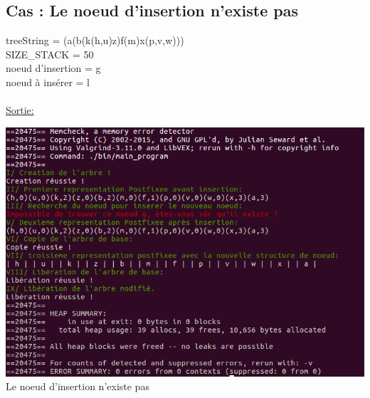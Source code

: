 \documentclass[a4paper]{article}
\begin{document}
\subsection{Cas : Le noeud d'insertion n'existe pas}
treeString = (a(b(k(h,u)z)f(m)x(p,v,w)))
\\ 
SIZE\_STACK = 50
\\
noeud d'insertion = g
\\
noeud à insérer = l
\\
\\
\underline{Sortie: }
\begin{center}
\includegraphics[scale=0.6]{pere_existe_pas.png}
\\
Le noeud d'insertion n'existe pas
\end{center}
\end{document}
